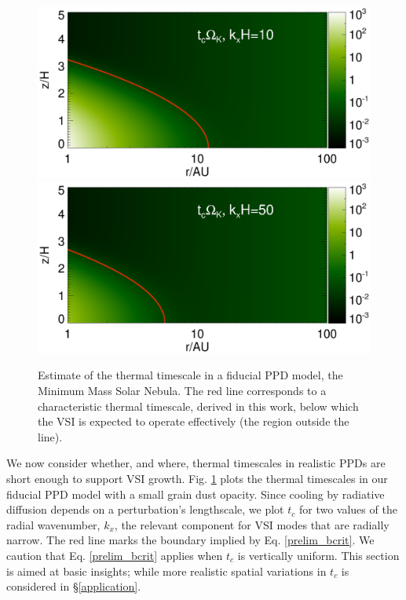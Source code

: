 \documentclass[iop, numberedappendix]{emulateapj}
\begin{document}
\begin{figure}
  \includegraphics[width=\linewidth,clip=true,trim=0cm 1.7cm 0cm
  0.73cm]{figures/bcrit_mmsn2d_kx10}
  \includegraphics[width=\linewidth,clip=true,trim=0cm 0.46cm 0cm
  0.73cm]{figures/bcrit_mmsn2d_kx50}
  \caption{Estimate of the thermal timescale  in a fiducial 
    PPD model, the Minimum Mass Solar Nebula. The red
    line corresponds to a characteristic thermal timescale, derived in
    this work, below which the VSI is expected to operate effectively
    (the region outside the line).    
    \label{bcrit_mmsn2d} 
  }
\end{figure}

We now consider whether, and where, thermal timescales in realistic PPDs
are short enough to support VSI growth.  Fig. \ref{bcrit_mmsn2d} plots the
 thermal timescales in our fiducial PPD model with a small grain dust opacity. 
 Since cooling by radiative diffusion depends on a perturbation's lengthscale, we
 plot $t_c$ for two values of the radial wavenumber,  $k_x$,  the relevant 
 component for VSI modes that are radially narrow.  The red line
marks the boundary implied by Eq. \ref{prelim_bcrit}.  We caution that 
 Eq. \ref{prelim_bcrit} applies when $t_c$ is vertically uniform.  This section is 
 aimed at basic insights; while more realistic spatial variations in
 $t_c$ is considered in \S\ref{application}. 
 
\end{document}
